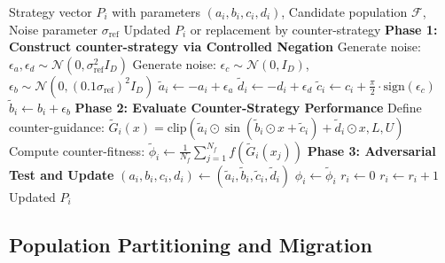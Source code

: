 \documentclass[11pt]{article}
\begin{document}
\begin{algorithm}[h]
\caption{Negation Operator Process}
\label{alg:negation}
\begin{algorithmic}[1]
\Require Strategy vector $P_i$ with parameters $(a_i, b_i, c_i, d_i)$, Candidate population $\mathcal{F}$, Noise parameter $\sigma_{\text{ref}}$
\Ensure Updated $P_i$ or replacement by counter-strategy
\State \textbf{Phase 1: Construct counter-strategy via Controlled Negation}
\State Generate noise: $\epsilon_a, \epsilon_d \sim \mathcal{N}(0, \sigma_{\text{ref}}^2 I_D)$
\State Generate noise: $\epsilon_c \sim \mathcal{N}(0, I_D)$, $\epsilon_b \sim \mathcal{N}(0, (0.1\sigma_{\text{ref}})^2 I_D)$
\State $\tilde{a}_i \leftarrow -a_i + \epsilon_a$ 
\State $\tilde{d}_i \leftarrow -d_i + \epsilon_d$ 
\State $\tilde{c}_i \leftarrow c_i + \frac{\pi}{2} \cdot \text{sign}(\epsilon_c)$ 
\State $\tilde{b}_i \leftarrow b_i + \epsilon_b$ 
\State \textbf{Phase 2: Evaluate Counter-Strategy Performance}
\State Define counter-guidance: $\tilde{G}_i(x) = \text{clip}(\tilde{a}_i \odot \sin(\tilde{b}_i \odot x + \tilde{c}_i) + \tilde{d}_i \odot x, L, U)$
\State Compute counter-fitness: $\tilde{\phi}_i \leftarrow \frac{1}{N_f} \sum_{j=1}^{N_f} f(\tilde{G}_i(x_j))$
\State \textbf{Phase 3: Adversarial Test and Update}
 
    \State $(a_i, b_i, c_i, d_i) \leftarrow (\tilde{a}_i, \tilde{b}_i, \tilde{c}_i, \tilde{d}_i)$ 
    \State $\phi_i \leftarrow \tilde{\phi}_i$ 
    \State $r_i \leftarrow 0$ 
\Else {}
    \State $r_i \leftarrow r_i + 1$ 
\EndIf
\State \Return Updated $P_i$
\end{algorithmic}
\end{algorithm}

\subsection{Population Partitioning and Migration}

\end{document}
